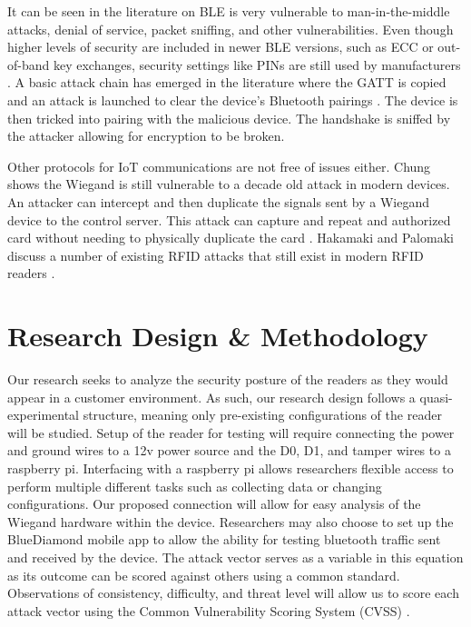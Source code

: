 \documentclass[10pt,twocolumn,letterpaper]{article}
\begin{document}
It can be seen in the literature on BLE is very vulnerable to man-in-the-middle attacks, denial of service, packet sniffing, and other vulnerabilities. Even though higher levels of security are included in newer BLE versions, such as ECC or out-of-band key exchanges, security settings like PINs are still used by manufacturers \cite{8622000}\cite{jaihc19}\cite{mryan13}. A basic attack chain has emerged in the literature where the GATT is copied and an attack is launched to clear the device's Bluetooth pairings \cite{jaihc19}. The device is then tricked into pairing with the malicious device. The handshake is sniffed by the attacker allowing for encryption to be broken.

Other protocols for IoT communications are not free of issues either. Chung shows the Wiegand is still vulnerable to a decade old attack in modern devices. An attacker can intercept and then duplicate the signals sent by a Wiegand device to the control server. This attack can capture and repeat and authorized card without needing to physically duplicate the card \cite{chung2017wiegand}. Hakamaki and Palomaki discuss a number of existing RFID attacks that still exist in modern RFID readers \cite{rfid15}.

\section{Research Design \& Methodology}
Our research seeks to analyze the security posture of the readers as they would appear in a customer environment. As such, our research design follows a quasi-experimental structure, meaning only pre-existing configurations of the reader will be studied. Setup of the reader for testing will require connecting the power and ground wires to a 12v power source and the D0, D1, and tamper wires to a raspberry pi. Interfacing with a raspberry pi allows researchers flexible access to perform multiple different tasks such as collecting data or changing configurations. Our proposed connection will allow for easy analysis of the Wiegand hardware within the device. Researchers may also choose to set up the BlueDiamond mobile app to allow the ability for testing bluetooth traffic sent and received by the device. The attack vector serves as a variable in this equation as its outcome can be scored against others using a common standard. Observations of consistency, difficulty, and threat level will allow us to score each attack vector using the Common Vulnerability Scoring System (CVSS) \cite{cvss}.
\end{document}
